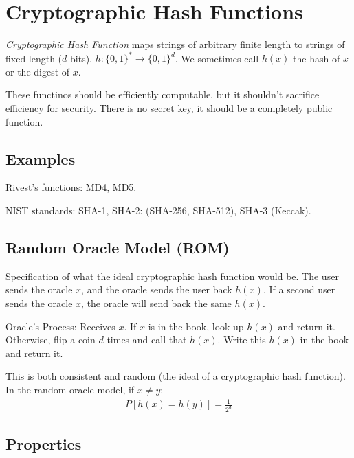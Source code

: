 \documentclass[psamsfonts]{amsart}
\begin{document}
\section{Cryptographic Hash Functions}

\emph{Cryptographic Hash Function} maps strings of arbitrary finite length to strings of fixed length ($d$ bits). $h: \{0, 1 \}^* \rightarrow \{0,1\}^d$. We sometimes call $h(x)$ the hash of $x$ or the digest of $x$.

These functinos should be efficiently computable, but it shouldn't sacrifice efficiency for security. There is no secret key, it should be a completely public function.

\subsection{Examples}

Rivest's functions: MD4, MD5. 

NIST standards: SHA-1, SHA-2: (SHA-256, SHA-512), SHA-3 (Keccak). 

\subsection{Random Oracle Model (ROM)}

Specification of what the ideal cryptographic hash function would be. The user sends the oracle $x$, and the oracle sends the user back $h(x)$. If a second user sends the oracle $x$, the oracle will send back the same $h(x)$. 

Oracle's Process: Receives $x$. If $x$ is in the book, look up $h(x)$ and return it. Otherwise, flip a coin $d$ times and call that $h(x)$. Write this $h(x)$ in the book and return it.

This is both consistent and random (the ideal of a cryptographic hash function). In the random oracle model, if $x \neq y$:
\begin{eqnarray}
P[h(x) = h(y)] = \frac{1}{2^d} 
\end{eqnarray}

\subsection{Properties}
\end{document}
